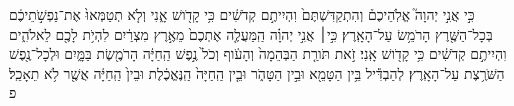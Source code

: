 \documentclass{openreader}
\begin{document}
כִּ֣י אֲנִ֣י יְהוָה֮ אֱלֹֽהֵיכֶם֒ וְהִתְקַדִּשְׁתֶּם֙ וִהְיִיתֶ֣ם קְדֹשִׁ֔ים כִּ֥י קָדֹ֖ושׁ אָ֑נִי וְלֹ֤א תְטַמְּאוּ֙ אֶת־נַפְשֹׁ֣תֵיכֶ֔ם בְּכָל־הַשֶּׁ֖רֶץ הָרֹמֵ֥שׂ עַל־הָאָֽרֶץ׃ 
כִּ֣י׀ אֲנִ֣י יְהוָ֗ה הַֽמַּעֲלֶ֤ה אֶתְכֶם֙ מֵאֶ֣רֶץ מִצְרַ֔יִם לִהְיֹ֥ת לָכֶ֖ם לֵאלֹהִ֑ים וִהְיִיתֶ֣ם קְדֹשִׁ֔ים כִּ֥י קָדֹ֖ושׁ אָֽנִי׃ 
זֹ֣את תֹּורַ֤ת הַבְּהֵמָה֙ וְהָעֹ֔וף וְכֹל֙ נֶ֣פֶשׁ הַֽחַיָּ֔ה הָרֹמֶ֖שֶׂת בַּמָּ֑יִם וּלְכָל־נֶ֖פֶשׁ הַשֹּׁרֶ֥צֶת עַל־הָאָֽרֶץ׃ 
לְהַבְדִּ֕יל בֵּ֥ין הַטָּמֵ֖א וּבֵ֣ין הַטָּהֹ֑ר וּבֵ֤ין הַֽחַיָּה֙ הַֽנֶּאֱכֶ֔לֶת וּבֵין֙ הַֽחַיָּ֔ה אֲשֶׁ֖ר לֹ֥א תֵאָכֵֽל׃ פ 
\end{document}

